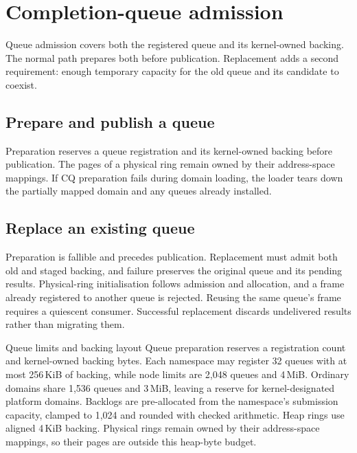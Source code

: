 \section{Completion-queue admission}

Queue admission covers both the registered queue and its kernel-owned backing.
The normal path prepares both before publication. Replacement adds a second
requirement: enough temporary capacity for the old queue and its candidate to
coexist.

\subsection{Prepare and publish a queue}

Preparation reserves a queue registration and its kernel-owned backing before
publication. The pages of a physical ring remain owned by their address-space
mappings. If CQ preparation fails during domain loading, the loader tears down
the partially mapped domain and any queues already installed.

\subsection{Replace an existing queue}

Preparation is fallible and precedes publication. Replacement must admit
both old and staged backing, and failure preserves the original queue and its
pending results. Physical-ring initialisation follows admission and allocation,
and a frame already registered to another queue is rejected. Reusing the same
queue's frame requires a quiescent consumer. Successful replacement discards
undelivered results rather than migrating them.

\begin{implementationdetail}{Queue limits and backing layout}
Queue preparation reserves a registration count and kernel-owned backing
bytes. Each namespace may register 32 queues with at most 256\,KiB of backing, while
node limits are 2,048 queues and 4\,MiB. Ordinary domains share 1,536 queues
and 3\,MiB, leaving a reserve for kernel-designated platform domains.
Backlogs are pre-allocated from the namespace's submission capacity, clamped
to 1,024 and rounded with checked arithmetic. Heap rings use aligned
4\,KiB backing. Physical rings remain owned by their address-space mappings, so
their pages are outside this heap-byte budget.
\end{implementationdetail}


